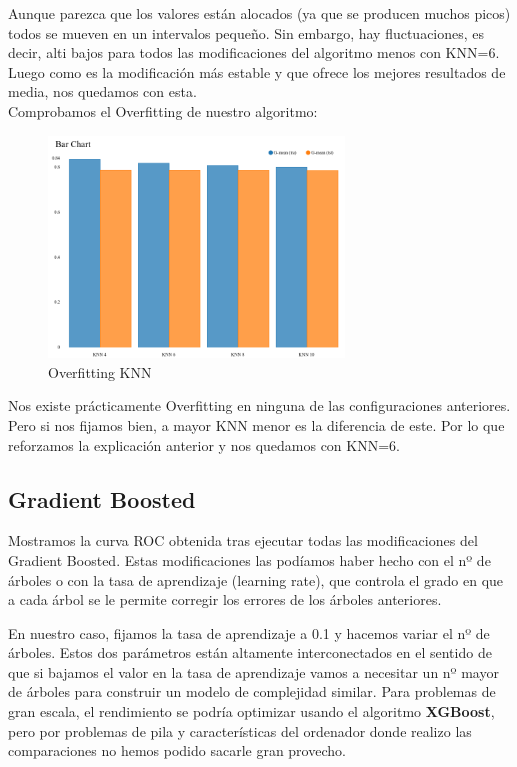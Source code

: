 	Aunque parezca que los valores están alocados (ya que se producen muchos picos) todos se mueven en un intervalos pequeño. Sin embargo, hay fluctuaciones, es decir, alti bajos para todos las modificaciones del algoritmo menos con KNN=6. Luego como es la modificación más estable y que ofrece los mejores resultados de media, nos quedamos con esta. \\


	\newpage
	Comprobamos el Overfitting de nuestro algoritmo:
	
	\begin{figure}[H]
		\centering
		\includegraphics[width=0.7\textwidth]{img/sobreknn.png}
		\caption{Overfitting KNN}
	\end{figure}

	Nos existe prácticamente Overfitting en ninguna de las configuraciones anteriores. Pero si nos fijamos bien, a mayor KNN menor es la diferencia de este. Por lo que reforzamos la explicación anterior y nos quedamos con KNN=6.

	\subsection{Gradient Boosted}
	
	\hspace{1cm} Mostramos la curva ROC obtenida tras ejecutar todas las modificaciones del Gradient Boosted. Estas modificaciones las podíamos haber hecho con el nº de árboles o con la tasa de aprendizaje (learning rate), que controla el grado en que a cada árbol se le permite corregir los errores de los árboles anteriores. 
	
	En nuestro caso, fijamos la tasa de aprendizaje a 0.1 y hacemos variar el nº de árboles. Estos dos parámetros están altamente interconectados en el sentido de que si bajamos el valor en la tasa de aprendizaje vamos a necesitar un nº mayor de árboles para construir un modelo de complejidad similar. Para problemas de gran escala, el rendimiento se podría optimizar usando el algoritmo \textbf{XGBoost}, pero por problemas de pila y características del ordenador donde realizo las comparaciones no hemos podido sacarle gran provecho. \\
	
